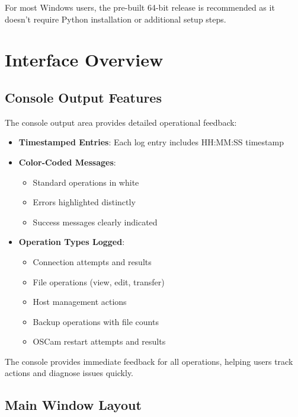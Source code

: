\documentclass[a4paper,11pt]{report}
\begin{document}
\begin{tipbox}
For most Windows users, the pre-built 64-bit release is recommended as it doesn't require Python installation or additional setup steps.
\end{tipbox}

\chapter{Interface Overview}

\section{Console Output Features}
The console output area provides detailed operational feedback:

\begin{itemize}
    \item \textbf{Timestamped Entries}: Each log entry includes HH:MM:SS timestamp
    \item \textbf{Color-Coded Messages}:
    \begin{itemize}
        \item Standard operations in white
        \item Errors highlighted distinctly
        \item Success messages clearly indicated
    \end{itemize}
    \item \textbf{Operation Types Logged}:
    \begin{itemize}
        \item Connection attempts and results
        \item File operations (view, edit, transfer)
        \item Host management actions
        \item Backup operations with file counts
        \item OSCam restart attempts and results
    \end{itemize}
\end{itemize}

\begin{tipbox}
The console provides immediate feedback for all operations, helping users track actions and diagnose issues quickly.
\end{tipbox}

\section{Main Window Layout}
\end{document}
